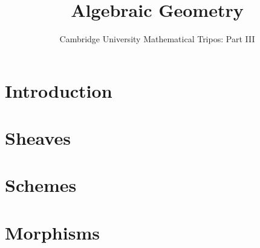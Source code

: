 \documentclass{article}
\title{Algebraic Geometry}
\author{Cambridge University Mathematical Tripos: Part III}
\begin{document}
\maketitle

\tableofcontentsnewpage{}


\section{Introduction}

\section{Sheaves}

\section{Schemes}

\section{Morphisms}

\end{document}
